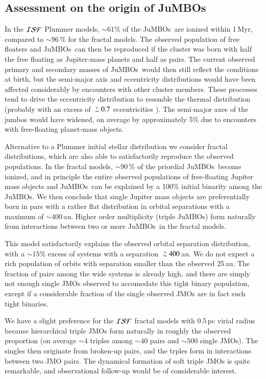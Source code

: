 \documentclass[submission,phys]{lib/SciPost}
\def\apgt{\ {\raise-.5ex\hbox{$\buildrel>\over\sim$}}\ }
\newcommand{\jumbos}{\mbox{JuMBOs}}
\begin{document}

\subsection{Assessment on the origin of \jumbos}

In the ${\cal ISF}$ Plummer models, $\sim 61$\% of the \jumbos\, are
ionized within 1\,Myr, compared to $\sim 96$\,\% for the fractal
models.  The observed population of free floaters and \jumbos\, can
then be reproduced if the cluster was born with half the free floating
as Jupiter-mass planets and half as pairs.  The current observed
primary and secondary masses of \jumbos\, would then still reflect the
conditions at birth, but the semi-major axis and eccentricity
distributions would have been affected considerably by encounters with
other cluster members. These processes tend to drive the eccentricity
distribution to resemble the thermal distribution (probably with an
excess of $\apgt 0.7$ eccentricities
\cite{2000IJoMP...15..4871P}). The semi-major axes of the jumbos would
have widened, on average by approximately 5\% due to encounters with
free-floating planet-mass objects.

Alternative to a Plummer initial stellar distribution we consider
fractal distributions, which are also able to satisfactorily reproduce
the observed populations. In the fractal models, $\sim 90$\,\% of the
priordial \jumbos\, become ionized, and in principle the entire
observed populations of free-floating Jupiter mass objects and
\jumbos\, can be explained by a 100\% initial binarity among the
\jumbos. We then conclude that single Jupiter mass objects are
preferentially born in pars with a rather flat distribution in orbital
separations with a maximum of $\sim 400$\,au.  Higher order
multiplicity (triple \jumbos) form naturally from interactions between
two or more \jumbos\, in the fractal models.

This model satisfactorily explains the observed orbital separation
distribution, with a $\sim 15$\% excess of systems with a separation
$\apgt 400$\,au. We do not expect a rich population of orbits with
separation smaller than the observed 25\,au. The fraction of pairs
among the wide systems is already high, and there are simply not
enough single JMOs observed to accomodate this tight binary
population, except if a considerable fraction of the single observed
JMOs are in fact such tight binaries.

We have a slight preference for the ${\cal ISF}$ fractal models with
0.5\,pc virial radius because hierarchical triple JMOs form naturally
in roughly the observed proportion (on average $\sim 4$ triples among
$\sim 40$ pairs and $\sim 500$ single JMOs). The singles then
originate from broken-up pairs, and the trples form in interactions
between two JMO pairs.  The dynamical formation of soft triple JMOs is
quite remarkable, and observational follow-up would be of considerable
interest.
\end{document}
